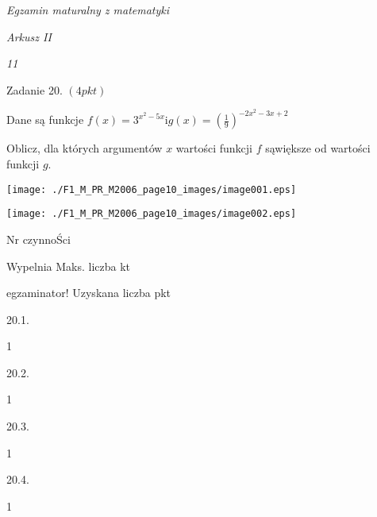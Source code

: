 \documentclass[a4paper,12pt]{article}
\begin{document}
{\it Egzamin maturalny z matematyki}

{\it Arkusz II}

{\it 11}

Zadanie 20. $(4pkt)$

Dane są funkcje $f(x)=3^{x^{2}-5x} \mathrm{i} g(x)=(\displaystyle \frac{1}{9})^{-2x^{2}-3x+2}$

Oblicz, dla których argumentów $x$ wartości funkcji $f$ sąwiększe od wartości funkcji $g.$
\begin{center}
\texttt{[image: ./F1\_M\_PR\_M2006\_page10\_images/image001.eps]}

\texttt{[image: ./F1\_M\_PR\_M2006\_page10\_images/image002.eps]}
\end{center}
Nr czynnoŚci

Wypelnia Maks. liczba kt

egzaminator! Uzyskana liczba pkt

20.1.

1

20.2.

1

20.3.

1

20.4.

1
\end{document}
